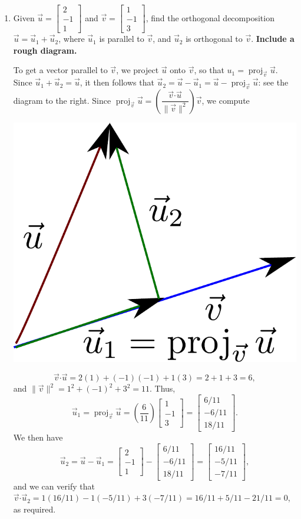 \documentclass[12pt]{article}
\newcommand{\len}[1]{\lVert #1\rVert}
\newcommand{\dotp}{\boldsymbol{\cdot}}
\newcommand{\bbm}{\begin{bmatrix}}
\newcommand{\ebm}{\end{bmatrix}}
\DeclareMathOperator{\proj}{proj}
\begin{document}
 \begin{enumerate}
 \item Given $\vec{u} = \bbm 2\\-1\\1\ebm$ and $\vec{v} = \bbm 1\\-1\\3\ebm$, find the orthogonal decomposition $\vec{u} = \vec{u}_1+\vec{u}_2$, where $\vec{u}_1$ is parallel to $\vec{v}$, and $\vec{u}_2$ is orthogonal to $\vec{v}$. {\bf Include a rough diagram.}

\bigskip

\begin{multicols}{2}
 To get a vector parallel to $\vec{v}$, we project $\vec{u}$ onto $\vec{v}$, so that $u_1 = \proj_{\vec{v}}\vec{u}$. Since $\vec{u}_1+\vec{u}_2=\vec{u}$, it then follows that $\vec{u}_2 = \vec{u}-\vec{u}_1 = \vec{u}-\proj_{\vec{v}}\vec{u}$: see the diagram to the right. Since $\proj_{\vec{v}}\vec{u} = \left(\dfrac{\vec{v}\dotp\vec{u}}{\len{\vec{v}}^2}\right)\vec{v}$, we compute\columnbreak
\begin{center}
 \includegraphics[width=0.4\columnwidth]{WS3-1}
\end{center}
\end{multicols}
\[
 \vec{v}\dotp\vec{u} = 2(1)+(-1)(-1)+1(3) = 2+1+3=6,
\]
and $\len{\vec{v}}^2 = 1^2+(-1)^2+3^2 = 11$. Thus,
\[
 \vec{u}_1 = \proj_{\vec{v}}\vec{u} = \left(\frac{6}{11}\right)\bbm 1\\-1\\3\ebm = \bbm 6/11\\-6/11\\18/11\ebm.
\]
We then have
\[
 \vec{u}_2 = \vec{u}-\vec{u}_1 = \bbm 2\\-1\\1\ebm - \bbm 6/11\\-6/11\\18/11\ebm = \bbm 16/11\\-5/11\\-7/11\ebm,
\]
and we can verify that $\vec{v}\dotp \vec{u}_2 = 1(16/11)-1(-5/11)+3(-7/11) = 16/11+5/11-21/11=0$, as required.


\end{enumerate}
\end{document}
